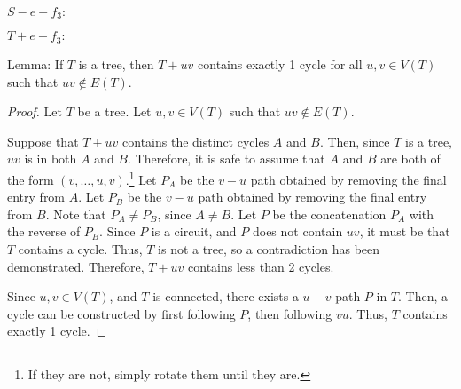 \documentclass[12pt]{article}
\begin{document}
$S-e+f_3:$
\begin{center}
\end{center}

$T+e-f_3:$
\begin{center}
\end{center}

\newpage{}

Lemma: If $T$ is a tree, then $T+uv$ contains exactly 1 cycle for all $u,v \in V(T)$ such that $uv \notin E(T)$.
\begin{proof}
    Let $T$ be a tree.
    Let $u,v \in V(T)$ such that $uv \notin E(T)$.
    
    Suppose that $T + uv$ contains the distinct cycles $A$ and $B$.
    Then, since $T$ is a tree, $uv$ is in both $A$ and $B$.
    Therefore, it is safe to assume that $A$ and $B$ are both of the form $(v, \hdots, u, v)$.\footnote{If they are not, simply rotate them until they are.}
    Let $P_A$ be the $v-u$ path obtained by removing the final entry from $A$.
    Let $P_B$ be the $v-u$ path obtained by removing the final entry from $B$.
    Note that $P_A \neq P_B$, since $A \neq B$.
    Let $P$ be the concatenation $P_A$ with the reverse of $P_B$.
    Since $P$ is a circuit, and $P$ does not contain $uv$, it must be that $T$ contains a cycle.
    Thus, $T$ is not a tree, so a contradiction has been demonstrated.
    Therefore, $T+uv$ contains less than 2 cycles.

    Since $u,v \in V(T)$, and $T$ is connected, there exists a $u-v$ path $P$ in $T$.
    Then, a cycle can be constructed by first following $P$, then following $vu$.
    Thus, $T$ contains exactly 1 cycle.
\end{proof}
\end{document}
